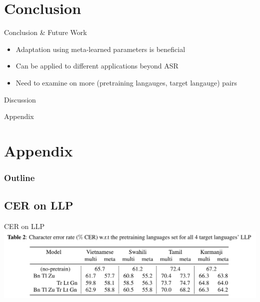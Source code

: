 \documentclass{beamer}
\begin{document}
\section{Conclusion}
\begin{frame}[t]{Conclusion \& Future Work}
  \begin{itemize}
    \item Adaptation using meta-learned parameters is beneficial
    \item Can be applied to different applications beyond ASR
    \item Need to examine on more (pretraining langauges, target langauge) pairs
  \end{itemize}
\end{frame}

\begin{frame}
	\begin{center}
    \LARGE{Discussion}
	\end{center}
\end{frame}




\begin{frame}
	\begin{center}
    \LARGE{Appendix}
	\end{center}
\end{frame}

\section{Appendix}
\begin{frame}
\frametitle{Outline}
\tableofcontents
\end{frame}

\subsection{CER on LLP}
\begin{frame}[t]{CER on LLP}
  \center \includegraphics[width=1.0\textwidth]{fig/llp_table.png}
\end{frame}
\end{document}
